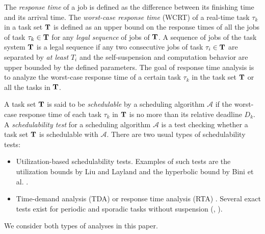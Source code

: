 
The \emph{response time} of a job is defined as the difference between its finishing time and its arrival
time. The \emph{worst-case response time} (WCRT) of a real-time task
$\tau_k$ in a task set ${\bf T}$ is defined as an upper bound on the
response times of all the jobs of task $\tau_k \in {\bf T}$ for any
\emph{legal sequence} of jobs of ${\bf T}$. A sequence of jobs of
the task system ${\bf T}$ is a legal sequence if any two consecutive
jobs of task $\tau_i \in {\bf T}$ are separated by \emph{at least}
$T_i$ and the self-suspension and computation behavior are upper
bounded by the defined parameters. The goal of response time analysis is to
analyze the worst-case response time of a certain task $\tau_k$ in the
task set ${\bf T}$ or all the tasks in ${\bf T}$.

A task set ${\bf T}$ is said to be \emph{schedulable} by a scheduling algorithm $\mathcal{A}$ if the worst-case response time of each task 
$\tau_k$ in ${\bf T}$ is no more than its relative deadline $D_k$.
A \emph{schedulability test} for a scheduling algorithm $\mathcal{A}$ is a test checking whether a task set ${\bf T}$ is schedulable with $\mathcal{A}$. There are
two usual types of schedulability tests:
\begin{itemize}
\item Utilization-based schedulability tests. Examples of such tests are the
  utilization bounds by Liu and Layland \cite{Liu_1973} and the hyperbolic bound by Bini et al. \cite{bini2003rate}.
\item Time-demand analysis (TDA) or response time analysis (RTA) \cite{lehoczky-1989}. Several exact tests exist for periodic and sporadic tasks without suspension (\eg, \cite{Liu_1973,spuri_96, goossens1997non, goossens1999feasibility, zhang2009schedulability}). %
\end{itemize}
We consider both types of analyses in this paper.


